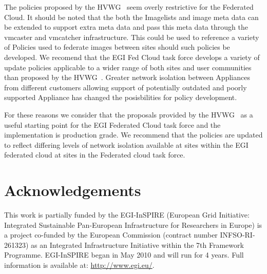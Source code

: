 \documentclass{llncs_Ibergrid2013}
\begin{document}
The policies proposed by the HVWG~\cite{hepix} seem overly restrictive for the Federated Cloud. It should be noted that the both the Imagelists and image meta data can be extended to support extra meta data and pass this meta data through the vmcaster and vmcatcher infrastructure. This could be used to reference a variety of Policies used to federate images between sites should such policies be developed. We recomend that the EGI Fed Cloud task force develops a variety of update policies applicable to a wider range of both sites and user communities than proposed by the HVWG~\cite{hepix}. Greater network isolation between Appliances from different customers allowing support of potentially outdated and poorly supported Appliance has changed the posisbilities for policy development.

For these reasons we consider that the proposals provided by the HVWG~\cite{hepix} as a useful starting point for the EGI Federated Cloud task force and the implementation is production grade. We recommend that the policies are updated to reflect differing levels of network isolation available at sites within the EGI federated cloud at sites in the Federated cloud task force.

\section*{Acknowledgements}
\label{sect-acknowledgements}
This work is partially funded by the  EGI-InSPIRE (European Grid Initiative: Integrated Sustainable
Pan-European Infrastructure for Researchers in Europe) is a project co-funded by the European Commission 
(contract number INFSO-RI-261323) as an Integrated Infrastructure Initiative within the 7th Framework 
Programme. EGI-InSPIRE began in May 2010 and will run for 4 years. Full information is available at:
\url{http://www.egi.eu/}.

%
%
%


%




\end{document}
